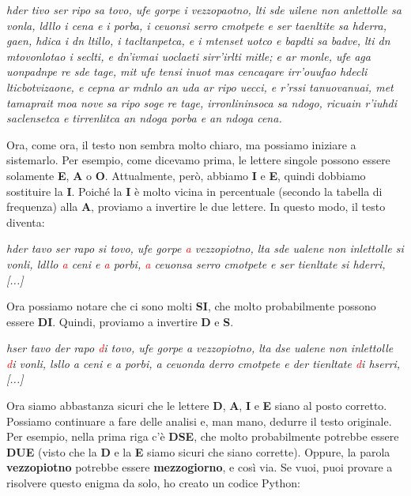 \documentclass{rapport}
\begin{document}
\vspace{0.2cm}

\textit{hder tivo ser ripo sa tovo, ufe gorpe i vezzopaotno, lti sde uilene non anlettolle
sa vonla, ldllo i cena e i porba, i ceuonsi serro cmotpete e ser taenltite sa hderra,
gaen, hdica i dn ltillo, i tacltanpetca, e i mtenset uotco e bapdti sa badve, lti dn
mtovonlotao i seclti, e dn’ivmai uoclaeti sirr’irlti mitle; e ar monle, ufe aga uonpadnpe
re sde tage, mit ufe tensi inuot mas cencaqare irr’ouufao hdecli lticbotvizaone, e cepna
ar mdnlo an uda ar ripo uecci, e r’rssi tanuovanuai, met tamaprait moa nove sa ripo soge
re tage, irronlininsoca sa ndogo, ricuain r’iuhdi saclensetca e tirrenlitca an ndoga
porba e an ndoga cena.}
\vspace{0.2cm}

Ora, come ora, il testo non sembra molto chiaro, ma possiamo iniziare a sistemarlo.  
Per esempio, come dicevamo prima, le lettere singole possono essere solamente \textbf{E}, \textbf{A} o \textbf{O}.  
Attualmente, però, abbiamo \textbf{I} e \textbf{E}, quindi dobbiamo sostituire la \textbf{I}.  
Poiché la \textbf{I} è molto vicina in percentuale (secondo la tabella di frequenza) alla \textbf{A}, proviamo a invertire le due lettere.  
In questo modo, il testo diventa:

\vspace{0.2cm}
\textit{hder tavo ser rapo si tovo, ufe gorpe \textcolor{red}{a} vezzopiotno, lta sde ualene non inlettolle
si vonli, ldllo \textcolor{red}{a} ceni e \textcolor{red}{a} porbi, \textcolor{red}{a} ceuonsa serro cmotpete e ser tienltate si hderri, [...]}
\vspace{0.2cm}

Ora possiamo notare che ci sono molti \textbf{SI}, che molto probabilmente possono essere \textbf{DI}.  
Quindi, proviamo a invertire \textbf{D} e \textbf{S}.

\vspace{0.2cm}
\textit{hser tavo der rapo \textcolor{red}{d}i tovo, ufe gorpe a vezzopiotno, lta dse ualene non inlettolle
\textcolor{red}{d}i vonli, lsllo a ceni e a porbi, a ceuonda derro cmotpete e der tienltate \textcolor{red}{d}i hserri, [...]}\vspace{0.2cm}

Ora siamo abbastanza sicuri che le lettere \textbf{D}, \textbf{A}, \textbf{I} e \textbf{E} siano al posto corretto.  
Possiamo continuare a fare delle analisi e, man mano, dedurre il testo originale.  
Per esempio, nella prima riga c'è \textbf{DSE}, che molto probabilmente potrebbe essere \textbf{DUE} (visto che la \textbf{D} e la \textbf{E} siamo sicuri che siano corrette).  
Oppure, la parola \textbf{vezzopiotno} potrebbe essere \textbf{mezzogiorno}, e così via.  
Se vuoi, puoi provare a risolvere questo enigma da solo, ho creato un codice Python: 
\end{document}
